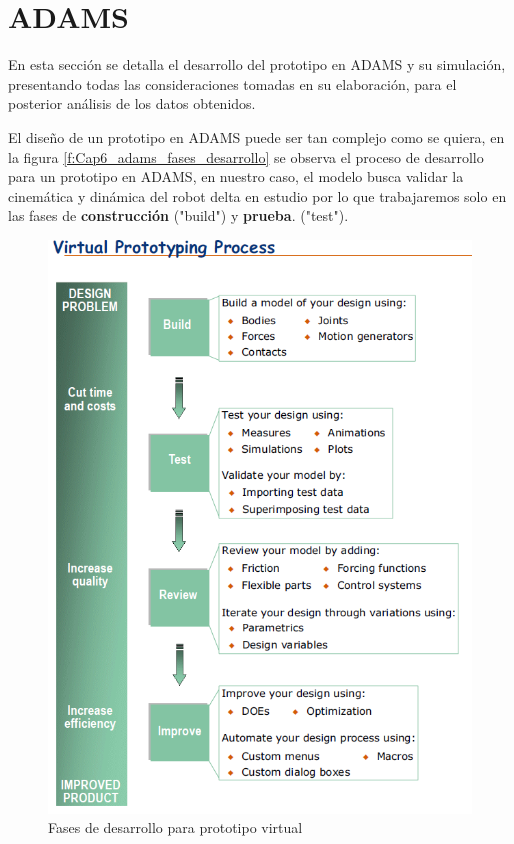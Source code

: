       \newpage
  
  



    \newpage


\section{ADAMS}

    En esta sección se detalla el desarrollo del prototipo en ADAMS y su simulación, presentando todas las consideraciones tomadas en su elaboración, para el posterior análisis de los datos obtenidos.

    El diseño de un prototipo en ADAMS puede ser tan complejo como se quiera, en la figura \eqref{f:Cap6_adams_fases_desarrollo} se observa el proceso de desarrollo para un prototipo en ADAMS, en nuestro caso, el modelo busca validar la cinemática y dinámica del robot delta en estudio por lo que trabajaremos solo en las fases de \textbf{construcción} ("build") y \textbf{prueba}. ("test").
    
    \begin{figure}[h]
        \centering
        \includegraphics[width=0.8\linewidth]{Main/Chapter6/Images6/adams/proceso_prototipo_virtual.png}
        \caption{Fases de desarrollo para prototipo virtual \cite{adams-basic}}
        \label{f:Cap6_adams_fases_desarrollo}
    \end{figure}
    
